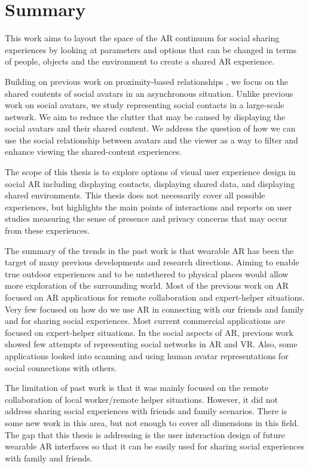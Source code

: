 \section{Summary}

This work aims to layout the space of the AR continuum for social sharing experiences by looking at parameters and options that can be changed in terms of people, objects and the environment to create a shared AR experience. 

Building on previous work on proximity-based relationships \cite{Sousa2016}, we focus on the shared contents of social avatars in an asynchronous situation. Unlike previous work on social avatars, we study representing social contacts in a large-scale network. We aim to reduce the clutter that may be caused by displaying the social avatars and their shared content. We address the question of how we can use the social relationship between avatars and the viewer as a way to filter and enhance viewing the shared-content experiences. 

The scope of this thesis is to explore options of visual user experience design in social AR including displaying contacts, displaying shared data, and displaying shared environments. This thesis does not necessarily cover all possible experiences, but highlights the main points of interactions and reports on user studies measuring the sense of presence and privacy concerns that may occur from these experiences. 

The summary of the trends in the past work is that
wearable AR has been the target of many previous developments and research directions. Aiming to enable true outdoor experiences and to be untethered to physical places would allow more exploration of the surrounding world. 
Most of the previous work on AR focused on AR applications for remote collaboration and expert-helper situations. Very few focused on how do we use AR in connecting with our friends and family and for sharing social experiences. Most current commercial applications are focused on expert-helper situations.
In the social aspects of AR, previous work showed few attempts of representing social networks in AR and VR. Also, some applications looked into scanning and using human avatar representations for social connections with others.

The limitation of past work is that it was mainly focused on the remote collaboration of local worker/remote helper situations. However, it did not address sharing social experiences with friends and family scenarios. There is some new work in this area, but not enough to cover all dimensions in this field. The gap that this thesis is addressing is the user interaction design of future wearable AR interfaces so that it can be easily used for sharing social experiences with family and friends. 

